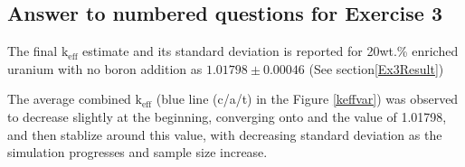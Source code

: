 \documentclass[a4paper, 11pt]{article}
\begin{document}
\subsection{Answer to numbered questions for Exercise 3}\label{Ex3Ans}
\begin{compactenum}
	\item The final $\text{k}_{\text{eff}}$ estimate and its standard deviation is reported for 20wt.\% enriched uranium with no boron addition as $1.01798 \pm 0.00046$ (See section\ref{Ex3Result})

	The average combined $\text{k}_{\text{eff}}$ (blue line (c/a/t) in the Figure \ref{keffvar}) was observed to decrease slightly at the beginning, converging onto and the value of 1.01798, and then stablize around this value, with decreasing standard deviation as the simulation progresses and sample size increase.


\end{compactenum}
\end{document}
